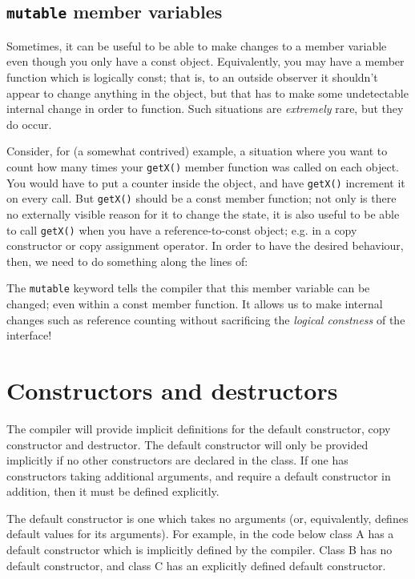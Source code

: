 \documentclass[a4paper]{scrartcl}
\begin{document}


\subsection{\texttt{mutable} member variables}
Sometimes, it can be useful to be able to make changes to a member variable even though you only have a const object. Equivalently, you may have a member function which is logically const; that is, to an outside observer it shouldn't appear to change anything in the object, but that has to make some undetectable internal change in order to function. Such situations are \emph{extremely} rare, but they do occur.

Consider, for (a somewhat contrived) example, a situation where you want to count how many times your \verb|getX()| member function was called on each object. You would have to put a counter inside the object, and have \verb|getX()| increment it on every call. But \verb|getX()| should be a const member function; not only is there no externally visible reason for it to change the state, it is also useful to be able to call \verb|getX()| when you have a reference-to-const object; e.g. in a copy constructor or copy assignment operator. In order to have the desired behaviour, then, we need to do something along the lines of:



The \verb|mutable| keyword tells the compiler that this member variable can be changed; even within a const member function. It allows us to make internal changes such as reference counting without sacrificing the \emph{logical constness} of the interface!

\section{Constructors and destructors}
The compiler will provide implicit definitions for the default constructor, copy constructor and destructor. The default constructor will only be provided implicitly if no other constructors are declared in the class. If one has constructors taking additional arguments, and require a default constructor in addition, then it must be defined explicitly.

The default constructor is one which takes no arguments (or, equivalently, defines default values for its arguments). For example, in the code below class A has a default constructor which is implicitly defined by the compiler. Class B has no default constructor, and class C has an explicitly defined default constructor.
\end{document}
